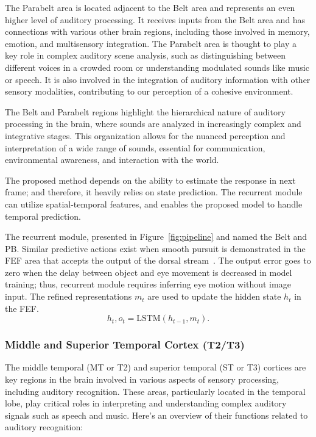 \documentclass[journal]{IEEEtran}
\begin{document}
The Parabelt area is located adjacent to the Belt area and represents an even higher level of auditory processing.
It receives inputs from the Belt area and has connections with various other brain regions, including those involved in memory, emotion, and multisensory integration.
The Parabelt area is thought to play a key role in complex auditory scene analysis, such as distinguishing between different voices in a crowded room or understanding modulated sounds like music or speech.
It is also involved in the integration of auditory information with other sensory modalities, contributing to our perception of a cohesive environment.

The Belt and Parabelt regions highlight the hierarchical nature of auditory processing in the brain, where sounds are analyzed in increasingly complex and integrative stages. 
This organization allows for the nuanced perception and interpretation of a wide range of sounds, essential for communication, environmental awareness, and interaction with the world.

The proposed method depends on the ability to estimate the response in next frame; 
and therefore, it heavily relies on state prediction. 
The recurrent module can utilize spatial-temporal features, 
and enables the proposed model to handle temporal prediction.

The recurrent module, presented in Figure~\ref{fig:pipeline} and named the Belt and PB. 
Similar predictive actions exist when smooth pursuit is demonstrated in the FEF area that accepts the output of the dorsal stream~\cite{b11,b13,b14}. 
The output error goes to zero when the delay between object and eye movement is decreased in model training; 
thus, recurrent module requires inferring eye motion without image input.
The refined representations $m_t$ are used to update the hidden state $h_t$ in the FEF. 
\begin{equation} \label{LSTM}
	h_t, o_t = \text{LSTM}(h_{t-1}, m_t).
\end{equation}


\subsubsection{Middle and Superior Temporal Cortex (T2/T3)}

The middle temporal (MT or T2) and superior temporal (ST or T3) cortices are key regions in the brain involved in various aspects of sensory processing, including auditory recognition. 
These areas, particularly located in the temporal lobe, play critical roles in interpreting and understanding complex auditory signals such as speech and music. 
Here's an overview of their functions related to auditory recognition:
\end{document}
